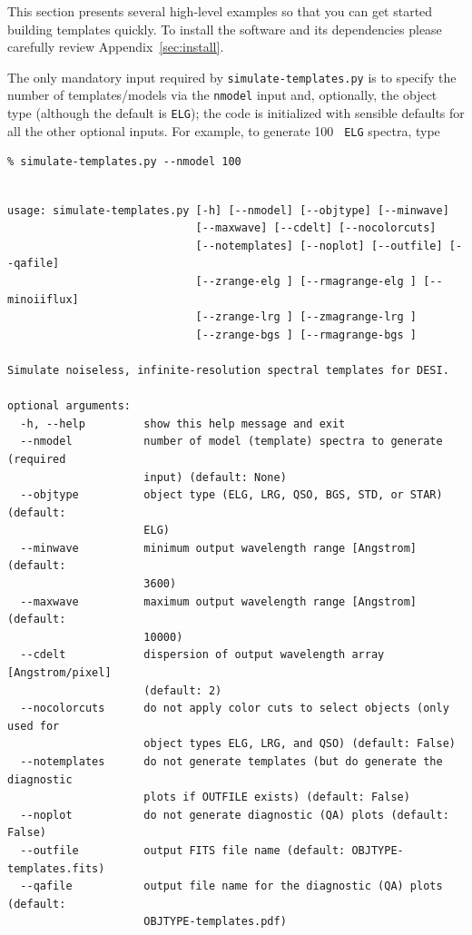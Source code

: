 \documentclass[11pt]{article}
\newcommand{\simt}{{\tt simulate-templates.py}}
\begin{document}
This section presents several high-level examples so that you can get started
building templates quickly.  To install the software and its dependencies please
carefully review Appendix~\ref{sec:install}.  

The only mandatory input required by \simt{} is to specify the number of
templates/models via the {\tt nmodel} input and, optionally, the object type
(although the default is {\tt ELG}); the code is initialized with sensible
defaults for all the other optional inputs.  For example, to generate 100 {\tt
  ELG} spectra, type

\begin{verbatim}
% simulate-templates.py --nmodel 100
\end{verbatim}




\begin{verbatim}

usage: simulate-templates.py [-h] [--nmodel] [--objtype] [--minwave]
                             [--maxwave] [--cdelt] [--nocolorcuts]
                             [--notemplates] [--noplot] [--outfile] [--qafile]
                             [--zrange-elg ] [--rmagrange-elg ] [--minoiiflux]
                             [--zrange-lrg ] [--zmagrange-lrg ]
                             [--zrange-bgs ] [--rmagrange-bgs ]

Simulate noiseless, infinite-resolution spectral templates for DESI.

optional arguments:
  -h, --help         show this help message and exit
  --nmodel           number of model (template) spectra to generate (required
                     input) (default: None)
  --objtype          object type (ELG, LRG, QSO, BGS, STD, or STAR) (default:
                     ELG)
  --minwave          minimum output wavelength range [Angstrom] (default:
                     3600)
  --maxwave          maximum output wavelength range [Angstrom] (default:
                     10000)
  --cdelt            dispersion of output wavelength array [Angstrom/pixel]
                     (default: 2)
  --nocolorcuts      do not apply color cuts to select objects (only used for
                     object types ELG, LRG, and QSO) (default: False)
  --notemplates      do not generate templates (but do generate the diagnostic
                     plots if OUTFILE exists) (default: False)
  --noplot           do not generate diagnostic (QA) plots (default: False)
  --outfile          output FITS file name (default: OBJTYPE-templates.fits)
  --qafile           output file name for the diagnostic (QA) plots (default:
                     OBJTYPE-templates.pdf)


\end{verbatim}
\end{document}
